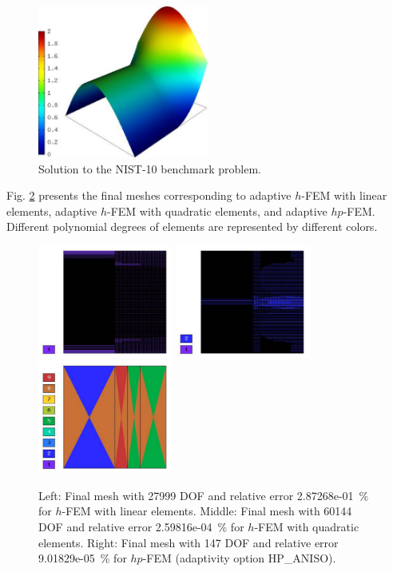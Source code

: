 \documentclass[12pt]{elsarticle}
\begin{document}
\begin{figure}[H]
\centering
\vspace{-6mm}
\includegraphics[height=5cm]{mafig59.pdf}
\vspace{-3mm}
\caption{Solution to the NIST-10 benchmark problem.}
\vspace{-3mm}
\label{fig:sln-nist10}
\end{figure}

Fig. \ref{fig:nist-10-hp-aniso} presents the final meshes corresponding to adaptive $h$-FEM with
linear elements, adaptive $h$-FEM with quadratic elements, and adaptive $hp$-FEM. Different
polynomial degrees of elements are represented by different colors.

\begin{figure}[H]
\centering
\includegraphics[height=3.7cm]{mafig60.pdf}
\includegraphics[height=3.7cm]{mafig61.pdf}
\includegraphics[height=3.7cm]{mafig62.pdf}
\caption{
Left: Final mesh with 27999 DOF and relative error 2.87268e-01~\% for $h$-FEM with linear elements.
Middle: Final mesh with 60144 DOF and relative error 2.59816e-04~\% for $h$-FEM with quadratic elements.
Right: Final mesh with 147 DOF and relative error 9.01829e-05~\% for $hp$-FEM (adaptivity option HP\_ANISO).}
\label{fig:nist-10-hp-aniso}
\end{figure}
\end{document}
